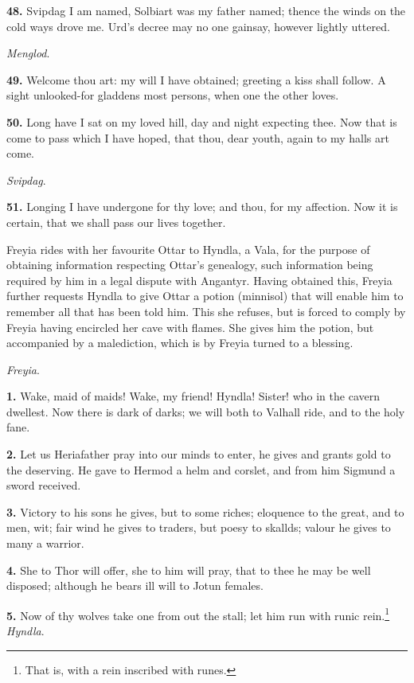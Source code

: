 \textbf{48.} Svipdag I am named, Solbiart was my father named; thence the
winds on the cold ways drove me. Urd's decree may no one gainsay,
however lightly uttered.

\emph{Menglod}.

\textbf{49.} Welcome thou art: my will I have obtained; greeting a kiss shall
follow. A sight unlooked-for gladdens most persons, when one the other
loves.

\textbf{50.} Long have I sat on my loved hill, day and night expecting thee.
Now that is come to pass which I have hoped, that thou, dear youth,
again to my halls art come.

\emph{Svipdag}.

\textbf{51.} Longing I have undergone for thy love; and thou, for my
affection. Now it is certain, that we shall pass our lives together.


Freyia rides with her favourite Ottar to Hyndla, a Vala, for the
purpose of obtaining information respecting Ottar's genealogy, such
information being required by him in a legal dispute with Angantyr.
Having obtained this, Freyia further requests Hyndla to give Ottar a
potion (minnisol) that will enable him to remember all that has been
told him. This she refuses, but is forced to comply by Freyia having
encircled her cave with flames. She gives him the potion, but
accompanied by a malediction, which is by Freyia turned to a blessing.

\emph{Freyia}.

\textbf{1.} Wake, maid of maids! Wake, my friend! Hyndla! Sister! who in the
cavern dwellest. Now there is dark of darks; we will both to Valhall
ride, and to the holy fane.

\textbf{2.} Let us Heriafather pray into our minds to enter, he gives and
grants gold to the deserving. He gave to Hermod a helm and corslet,
and from him Sigmund a sword received.

\textbf{3.} Victory to his sons he gives, but to some riches; eloquence to
the great, and to men, wit; fair wind he gives to traders, but poesy
to skallds; valour he gives to many a warrior.

\textbf{4.} She to Thor will offer, she to him will pray, that to thee he may
be well disposed; although he bears ill will to Jotun females.

\textbf{5.} Now of thy wolves take one from out the stall; let him run with
runic rein.\footnote{That is, with a rein inscribed with runes.} \emph{Hyndla}.

